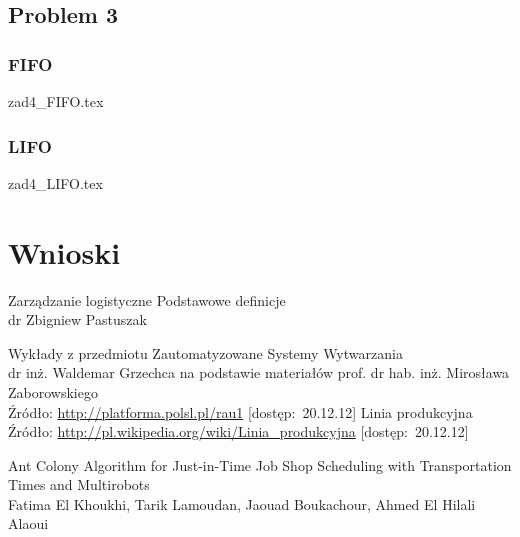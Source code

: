 \documentclass[twoside]{kInzynierka}
\begin{document}
\newpage
\subsection     {Problem 3}
\subsubsection  {FIFO}
 {zad4_FIFO.tex}
\subsubsection  {LIFO}
 {zad4_LIFO.tex}

\section        {Wnioski}

   
\begin{thebibliography}{99}

Zarządzanie logistyczne Podstawowe definicje \\
dr Zbigniew Pastuszak

Wykłady z przedmiotu Zautomatyzowane Systemy Wytwarzania\\
dr inż. Waldemar Grzechca na podstawie materiałów prof. dr hab. inż. Mirosława Zaborowskiego \\
Źródło: \url{http://platforma.polsl.pl/rau1} [dostęp:~20.12.12]
Linia produkcyjna \\
Źródło: \url{http://pl.wikipedia.org/wiki/Linia_produkcyjna} [dostęp:~20.12.12]

    Ant Colony Algorithm for Just-in-Time Job Shop Scheduling with Transportation Times and Multirobots \\
    Fatima El Khoukhi, Tarik Lamoudan, Jaouad Boukachour, Ahmed El Hilali Alaoui




\end{thebibliography}
\end{document}
